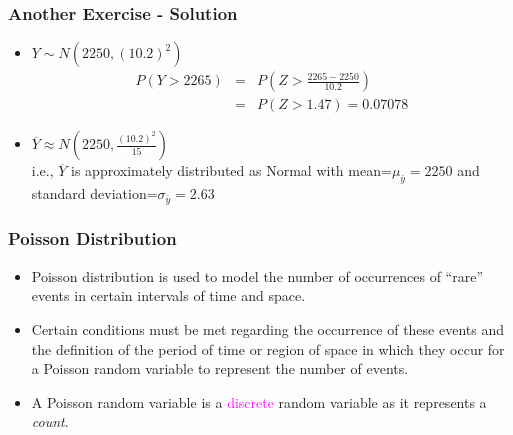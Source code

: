 \documentclass[xcolor=dvipsnames,12pt]{beamer}
\begin{document}
        
          
\begin{frame}
\frametitle{Another Exercise - Solution}
\begin{itemize}
  \item[a)] $Y \sim N(2250, (10.2)^2)$ \\[-.3in]
            \begin{eqnarray*}
            P(Y > 2265) & = & P\left(Z > \frac{2265-2250}{10.2}\right)\\[.2in]
            & = & P(Z > 1.47) =  0.07078          
            \end{eqnarray*}
  \item[b)] $\overline{Y} \approx N\left(2250, \frac{(10.2)^2}{15}\right)$\\[.2in]
             i.e., $\overline{Y}$ is approximately distributed as Normal with mean=$\mu_{\bar{y}}=2250$ and  standard deviation=$\sigma_{\bar{y}} = 2.63$         
\end{itemize}
\end{frame}




\begin{frame}
\frametitle{Poisson Distribution}
\begin{itemize}
\item Poisson distribution is used to model the number of occurrences of ``rare'' events in certain intervals of time and space.
\item Certain conditions must be met regarding the occurrence of these events and the definition of the period of time or region of space in which they occur for a Poisson random variable to represent the number of events. 
\item A Poisson random variable is a {\textcolor{magenta}{discrete}} random variable as it represents a \emph{count}.
\end{itemize}
\end{frame}
\end{document}
